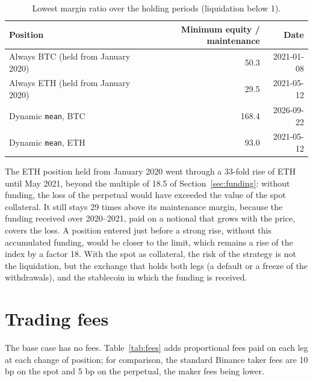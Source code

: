 \documentclass[11pt,a4paper]{article}
\newcommand{\code}[1]{\texttt{#1}}
\begin{document}
\begin{table}[h]
\centering
\small
\begin{tabular}{@{}lrr@{}}
\toprule
\textbf{Position} & \textbf{Minimum equity / maintenance} & \textbf{Date} \\
\midrule
Always BTC (held from January 2020) & 50.3 & 2021-01-08 \\
Always ETH (held from January 2020) & 29.5 & 2021-05-12 \\
Dynamic \code{mean}, BTC & 168.4 & 2026-09-22 \\
Dynamic \code{mean}, ETH & 93.0 & 2021-05-12 \\
\bottomrule
\end{tabular}
\caption{Lowest margin ratio over the holding periods (liquidation below 1).}
\label{tab:margin}
\end{table}

The ETH position held from January 2020 went through a 33-fold rise of ETH until May 2021, beyond the multiple of
18.5 of Section~\ref{sec:funding}: without funding, the loss of the perpetual would have exceeded the value of the
spot collateral. It still stays 29 times above its maintenance margin, because the funding received over 2020--2021,
paid on a notional that grows with the price, covers the loss. A position entered just before a strong rise, without
this accumulated funding, would be closer to the limit, which remains a rise of the index by a factor 18. With the spot as collateral, the risk of
the strategy is not the liquidation, but the exchange that holds both legs (a default or a freeze of the withdrawals),
and the stablecoin in which the funding is received.

\section{Trading fees}\label{sec:fees}
The base case has no fees. Table~\ref{tab:fees} adds proportional fees paid on each leg at each change of position;
for comparison, the standard Binance taker fees are 10 bp on the spot and 5 bp on the perpetual, the maker fees being
lower.
\end{document}
